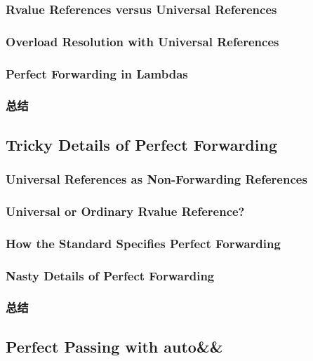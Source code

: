 \documentclass[11pt,a4paper,UTF8]{ctexart}
\begin{document}
		\subsubsection{Rvalue References versus Universal References}
		\subsubsection{Overload Resolution with Universal References}
		\subsubsection{Perfect Forwarding in Lambdas}
		\subsubsection{总结}
	\subsection{Tricky Details of Perfect Forwarding}
		\subsubsection{Universal References as Non-Forwarding References}
		\subsubsection{Universal or Ordinary Rvalue Reference?}
		\subsubsection{How the Standard Specifies Perfect Forwarding}
		\subsubsection{Nasty Details of Perfect Forwarding}
		\subsubsection{总结}
	\subsection{Perfect Passing with auto\&\&}
\end{document}
